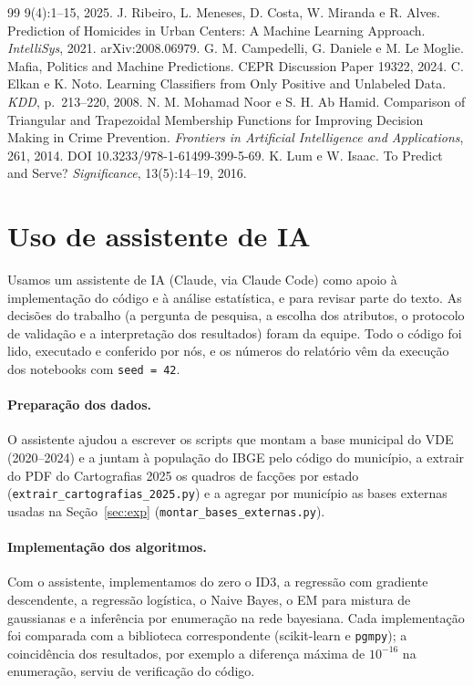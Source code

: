 \documentclass[10pt,a4paper,twocolumn]{article}
\begin{document}
\begin{thebibliography}{99}
9(4):1--15, 2025.
 J. Ribeiro, L. Meneses, D. Costa, W. Miranda e R. Alves. Prediction of Homicides
in Urban Centers: A Machine Learning Approach. \emph{IntelliSys}, 2021. arXiv:2008.06979.
 G. M. Campedelli, G. Daniele e M. Le Moglie. Mafia, Politics and Machine
Predictions. CEPR Discussion Paper 19322, 2024.
 C. Elkan e K. Noto. Learning Classifiers from Only Positive and Unlabeled Data.
\emph{KDD}, p.\ 213--220, 2008.
 N. M. Mohamad Noor e S. H. Ab Hamid. Comparison of Triangular and Trapezoidal
Membership Functions for Improving Decision Making in Crime Prevention. \emph{Frontiers in
Artificial Intelligence and Applications}, 261, 2014. DOI 10.3233/978-1-61499-399-5-69.
 K. Lum e W. Isaac. To Predict and Serve? \emph{Significance}, 13(5):14--19,
2016.
\end{thebibliography}

\appendix
\section{Uso de assistente de IA}

Usamos um assistente de IA (Claude, via Claude Code) como apoio à implementação do código e
à análise estatística, e para revisar parte do texto. As decisões do trabalho (a pergunta de
pesquisa, a escolha dos atributos, o protocolo de validação e a interpretação dos
resultados) foram da equipe. Todo o código foi lido, executado e conferido por nós, e os
números do relatório vêm da execução dos notebooks com \texttt{seed = 42}.

\paragraph{Preparação dos dados.} O assistente ajudou a escrever os scripts que montam a base
municipal do VDE (2020--2024) e a juntam à população do IBGE pelo código do município, a
extrair do PDF do Cartografias 2025 os quadros de facções por estado
(\texttt{extrair\_cartografias\_2025.py}) e a agregar por município as bases externas usadas
na Seção~\ref{sec:exp} (\texttt{montar\_bases\_externas.py}).

\paragraph{Implementação dos algoritmos.} Com o assistente, implementamos do zero o ID3, a
regressão com gradiente descendente, a regressão logística, o Naive Bayes, o EM para mistura
de gaussianas e a inferência por enumeração na rede bayesiana. Cada implementação foi
comparada com a biblioteca correspondente (scikit-learn e \texttt{pgmpy}); a coincidência
dos resultados, por exemplo a diferença máxima de $10^{-16}$ na enumeração, serviu de
verificação do código.
\end{document}
